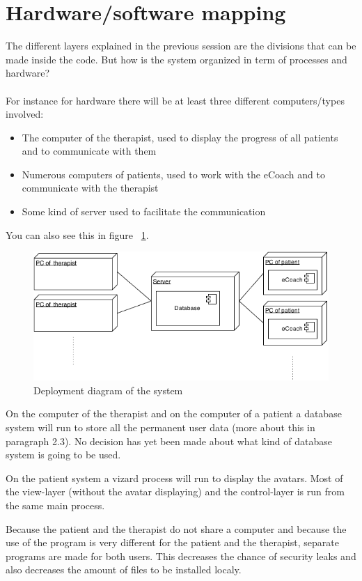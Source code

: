 \section{Hardware/software mapping}
\label{sec:hardsoftmap}

The different layers explained in the previous session are the divisions that can be made inside the code. But how is the system organized in term of processes and hardware? 
\paragraph{}
For instance for hardware there will be at least three different computers/types involved: 
\begin{itemize}
\item The computer of the therapist, used to display the progress of all patients and to communicate with them
\item Numerous computers of patients, used to work with the eCoach and to communicate with the therapist
\item Some kind of server used to facilitate the communication
\end{itemize}
You can also see this in figure ~\ref{fig:deploymentdiagram}.
\begin{figure}
  \centering
  \includegraphics[width=\textwidth]{deployment-diagram.png}
  \caption{Deployment diagram of the system} 
  \label{fig:deploymentdiagram}
\end{figure}
On the computer of the therapist and on the computer of a patient a database system will run to store all the permanent user data (more about this in paragraph 2.3).  No decision has yet been made about what kind of database system is going to be used.

On the patient system a vizard process will run to display the avatars. Most of the view-layer (without the avatar displaying) and the control-layer is run from the same main process. 

Because the patient and the therapist do not share a computer and because the use of the program is very different for the patient and the therapist, separate programs are made for both users. This decreases the chance of security leaks and also decreases the amount of files to be installed localy.

